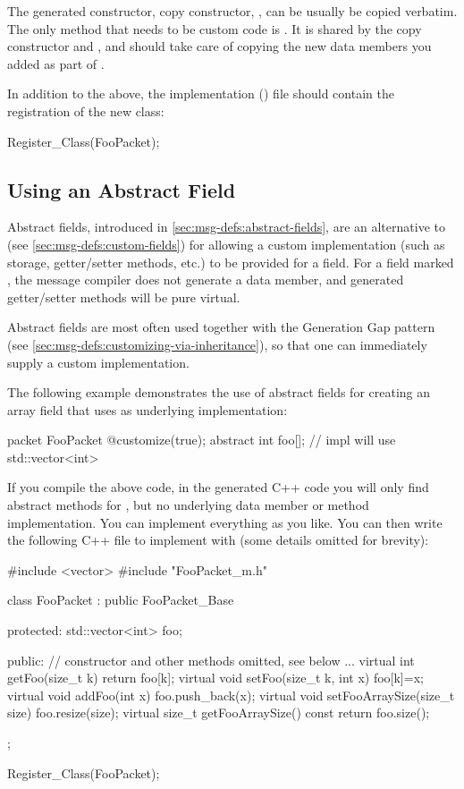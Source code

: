 The generated constructor, copy constructor, ,  can be
usually be copied verbatim. The only method that needs to be custom code is
. It is shared by the copy constructor and , and
should take care of copying the new data members you added as part of
.

In addition to the above, the implementation () file should contain the
registration of the new class:

\begin{cpp}
Register_Class(FooPacket);
\end{cpp}


\subsection{Using an Abstract Field}
\label{sec:msg-defs:customizing-via-abstact-field}

Abstract fields, introduced in \ref{sec:msg-defs:abstract-fields}, are an
alternative to  (see \ref{sec:msg-defs:custom-fields}) for
allowing a custom implementation (such as storage, getter/setter methods, etc.)
to be provided for a field. For a field marked , the message compiler does
not generate a data member, and generated getter/setter methods will be pure
virtual.

Abstract fields are most often used together with the Generation Gap pattern
(see \ref{sec:msg-defs:customizing-via-inheritance}), so that one can
immediately supply a custom implementation.

The following example demonstrates the use of abstract fields for creating
an array field that uses  as underlying implementation:

\begin{msg}
packet FooPacket
{
    @customize(true);
    abstract int foo[]; // impl will use std::vector<int>
}
\end{msg}

If you compile the above code, in the generated C++ code you will only find
abstract methods for , but no underlying data member or method
implementation. You can implement everything as you like. You can then write the
following C++ file to implement  with  (some
details omitted for brevity):

\begin{cpp}
#include <vector>
#include "FooPacket_m.h"

class FooPacket : public FooPacket_Base
{
  protected:
    std::vector<int> foo;

  public:
    // constructor and other methods omitted, see below
    ...
    virtual int getFoo(size_t k) {return foo[k];}
    virtual void setFoo(size_t k, int x) {foo[k]=x;}
    virtual void addFoo(int x) {foo.push_back(x);}
    virtual void setFooArraySize(size_t size) {foo.resize(size);}
    virtual size_t getFooArraySize() const {return foo.size();}
};

Register_Class(FooPacket);
\end{cpp}

